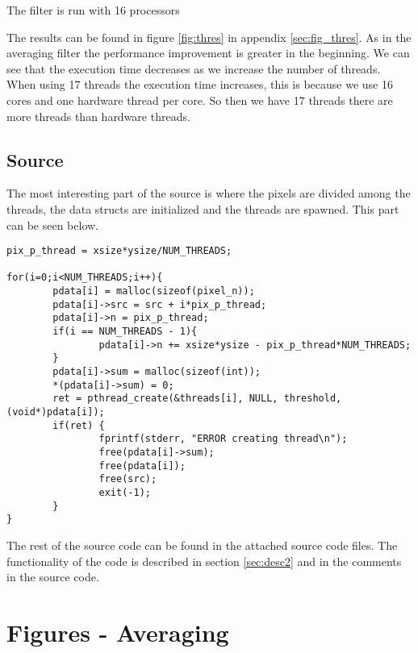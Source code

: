 \documentclass[a4paper, 12pt]{article}
\begin{document}
The filter is run with 16 processors


The results can be found in figure \ref{fig:thres} in appendix
\ref{sec:fig_thres}. As in the averaging filter the performance improvement is
greater in the beginning. We can see that the execution time decreases as we
increase the number of threads. When using 17 threads the execution time
increases, this is because we use 16 cores and one hardware thread per core. So
then we have 17 threads there are more threads than hardware threads.

\subsection{Source}

The most interesting part of the source is where the pixels are divided among
the threads, the data structs are initialized and the threads are spawned. 
This part can be seen below.
\begin{lstlisting}
pix_p_thread = xsize*ysize/NUM_THREADS;

for(i=0;i<NUM_THREADS;i++){
        pdata[i] = malloc(sizeof(pixel_n));
        pdata[i]->src = src + i*pix_p_thread;
        pdata[i]->n = pix_p_thread;
        if(i == NUM_THREADS - 1){
                pdata[i]->n += xsize*ysize - pix_p_thread*NUM_THREADS;
        }
        pdata[i]->sum = malloc(sizeof(int));
        *(pdata[i]->sum) = 0;
        ret = pthread_create(&threads[i], NULL, threshold, (void*)pdata[i]);
        if(ret) {
                fprintf(stderr, "ERROR creating thread\n");
                free(pdata[i]->sum);
                free(pdata[i]);
                free(src);
                exit(-1);
        }
}
\end{lstlisting}

The rest of the source code can be found in the attached source code files.
The functionality of the code is described in section \ref{sec:desc2} and in the
comments in the source code.

\newpage
\appendix
\section{Figures - Averaging}
\label{sec:fig_aver}
\end{document}
